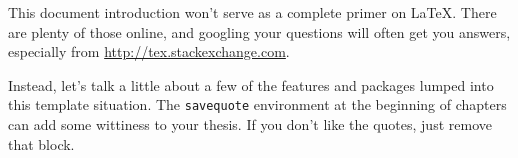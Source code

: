 {
    {
        {
            {
            }
        }
    }
    {
        {
            {
                {
                    {
                        {
                            {
                                {
                                    {
                                    }
                                }
                            }
                        }
                    }
                }
            }
        }
    }
    {
    }
    {
        {
            {
                {
                }
            }
        }
    }
    {
    }
    {
        {
        }
    }
}





















This document introduction won't serve as a complete primer on \LaTeX.  There are plenty of those online, and googling your questions will often get you answers, especially from \url{http://tex.stackexchange.com}.

Instead, let's talk a little about a few of the features and packages lumped into this template situation.  The \verb|savequote| environment at the beginning of chapters can add some wittiness to your thesis.  If you don't like the quotes, just remove that block.

